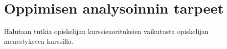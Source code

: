 \chapter{Oppimisen analysoinnin tarpeet\label{oppimisenanalysoinnintarpeet}}

Halutaan tutkia opiskelijan kurssisuorituksien vaikutusta opiskelijan menestykseen kurssilla.